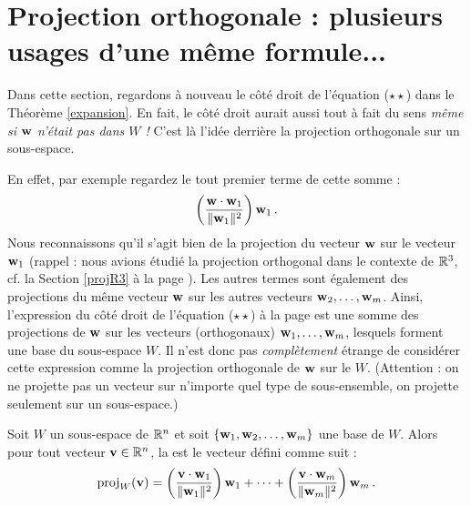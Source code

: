 
\section{Projection orthogonale : plusieurs usages d'une même formule... }

Dans cette section, regardons à nouveau le côté droit de l'équation ($\star\star$) dans le Théorème \ref{expansion}. En fait, le côté droit aurait aussi tout à fait du sens {\it même si $\mathbf{w}$ n'était pas dans $W$ !}  C'est là l'idée derrière la projection orthogonale sur un sous-espace.

En effet, par exemple regardez le tout premier terme de cette somme : 
$$\left( \frac{ \mathbf{w} \cdot\mathbf{w}_1}{\Vert \mathbf{w}_1 \Vert^2} \right) \mathbf{w}_1\,.$$ 
Nous reconnaissons qu'il s'agit bien de la projection du vecteur $\mathbf{w}$ sur le vecteur $\mathbf{w}_1$ (rappel : nous avions étudié la projection orthogonal dans le contexte de $\mathbb{R}^3$, cf. la Section \ref{projR3} à la page \pageref{projR3}). Les autres termes sont également des projections du même vecteur $\mathbf{w}$ sur les autres vecteurs $\mathbf{w}_2, \dots, \mathbf{w}_m$. Ainsi, l'expression du côté droit de l'équation ($\star\star$) \`a la page \pageref{expand} est une somme des projections de $\mathbf{w}$ sur les vecteurs (orthogonaux) $\mathbf{w}_1, \dots, \mathbf{w}_m$, lesquels forment une base du sous-espace $W$.  Il n'est donc pas {\it complètement} \'etrange de considérer cette expression comme la projection orthogonale de $\mathbf{w}$ sur le  $W$. (Attention : on ne projette pas un vecteur sur n'importe quel type de sous-ensemble, on projette seulement sur un sous-espace.)




\begin{definition}\label{projdef}
Soit $W$ un sous-espace de $\mathbb{R}^n$ et soit $\{ \mathbf{w}_1,\mathbf{w}_2, \ldots, \mathbf{w}_m\}$ une base  de $W$.    
Alors pour tout vecteur $\mathbf{v} \in \mathbb{R}^n$, la  est le vecteur défini comme suit :
$$
\operatorname{proj}_W(\mathbf{v}) = \left(\frac{\mathbf{v}\cdot \mathbf{w}_1}{\Vert \mathbf{w}_1\Vert^2}\right) \mathbf{w}_1 + \cdots 
+ 
\left(\frac{\mathbf{v}\cdot \mathbf{w}_m}{\Vert \mathbf{w}_m\Vert^2}\right)\mathbf{w}_m\,.
$$
\end{definition}

